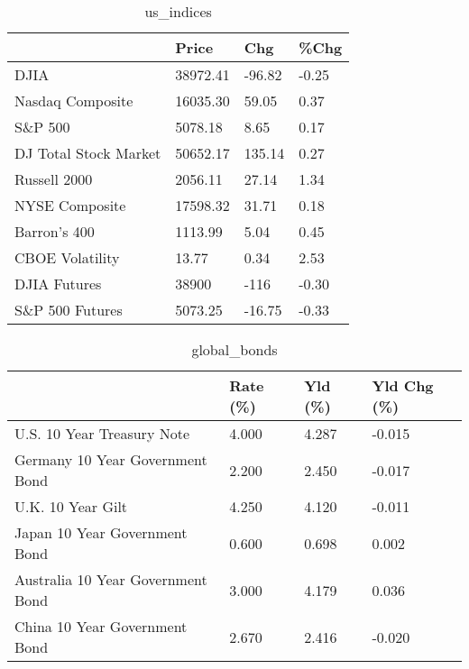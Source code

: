 \documentclass{article}%
\begin{document}
%


\begin{table}[htbp]%
\caption{us\_indices}%
\centering%
\begin{adjustbox}{width=1\textwidth}%
\begin{tabular}{llll}
\toprule
                      &    Price &    Chg &  \%Chg \\
\midrule
                 DJIA & 38972.41 & -96.82 & -0.25 \\
     Nasdaq Composite & 16035.30 &  59.05 &  0.37 \\
              S\&P 500 &  5078.18 &   8.65 &  0.17 \\
DJ Total Stock Market & 50652.17 & 135.14 &  0.27 \\
         Russell 2000 &  2056.11 &  27.14 &  1.34 \\
       NYSE Composite & 17598.32 &  31.71 &  0.18 \\
         Barron's 400 &  1113.99 &   5.04 &  0.45 \\
      CBOE Volatility &    13.77 &   0.34 &  2.53 \\
         DJIA Futures &    38900 &   -116 & -0.30 \\
      S\&P 500 Futures &  5073.25 & -16.75 & -0.33 \\
\bottomrule
\end{tabular}
%
\end{adjustbox}%
\end{table}

%


\begin{table}[htbp]%
\caption{global\_bonds}%
\centering%
\begin{adjustbox}{width=1\textwidth}%
\begin{tabular}{llll}
\toprule
                                  & Rate (\%) & Yld (\%) & Yld Chg (\%) \\
\midrule
       U.S. 10 Year Treasury Note &    4.000 &   4.287 &      -0.015 \\
  Germany 10 Year Government Bond &    2.200 &   2.450 &      -0.017 \\
                U.K. 10 Year Gilt &    4.250 &   4.120 &      -0.011 \\
    Japan 10 Year Government Bond &    0.600 &   0.698 &       0.002 \\
Australia 10 Year Government Bond &    3.000 &   4.179 &       0.036 \\
    China 10 Year Government Bond &    2.670 &   2.416 &      -0.020 \\
\bottomrule
\end{tabular}
%
\end{adjustbox}%
\end{table}
\end{document}
